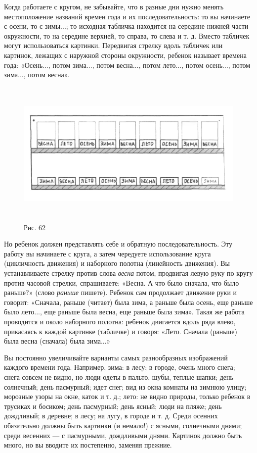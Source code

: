 \documentclass{book}
\renewcommand{\emph}[1]{\textit{#1}}
\begin{document}
Когда работаете с кругом, не забывайте, что в разные дни нужно менять
местоположение названий времен года и их последовательность: то вы
начинаете с осени, то с зимы...; то исходная табличка находится на
середине нижней части окружности, то на середине верхней, то справа, то
слева и т. д. Вместо табличек могут использоваться картинки. Передвигая
стрелку вдоль табличек или картинок, лежащих с наружной стороны
окружности, ребенок называет времена года: «Осень..., потом зима...,
потом весна..., потом лето..., потом осень..., потом зима..., потом
весна».

\begin{figure}
\centering
\includegraphics[width=6.21421in,height=2.81563in]{media/media/image59.jpg}
\caption*{Рис. 62}
\end{figure}

Но ребенок должен представлять себе и обратную последовательность. Эту
работу вы начинаете с круга, а затем чередуете использование круга
(цикличность движения) и наборного полотна (линейность движения). Вы
устанавливаете стрелку против слова \emph{весна} потом, продвигая левую
руку по кругу против часовой стрелки, спрашиваете: «Весна. А что было
сначала, что было раньше?» (слово \emph{раньше} пишете). Ребенок сам
продолжает движение руки и говорит: «Сначала, раньше (читает) была зима,
а раньше была осень, еще раньше было лето..., еще раньше была весна, еще
раньше была зима». Такая же работа проводится и около наборного полотна:
ребенок двигается вдоль ряда влево, прикасаясь к каждой картинке
(табличке) и говоря: «Лето. Сначала (раньше) была весна (сначала) была
зима...»

Вы постоянно увеличивайте варианты самых разнообразных изображений
каждого времени года. Например, зима: в лесу; в городе, очень много
снега; снега совсем не видно, но люди одеты в пальто, шубы, теплые
шапки; день солнечный; день пасмурный; идет снег; вид из окна комнаты на
зимнюю улицу; морозные узоры на окне, каток и т. д.; лето: не видно
природы, только ребенок в трусиках и босиком; день пасмурный; день
ясный; люди на пляже; день дождливый; в деревне; в лесу; на лугу, в
городе и т. д. Среди осенних обязательно должны быть картинки (и
немало!) с ясными, солнечными днями; среди весенних --- с пасмурными,
дождливыми днями. Картинок должно быть много, но вы вводите их
постепенно, заменяя прежние.
\end{document}
